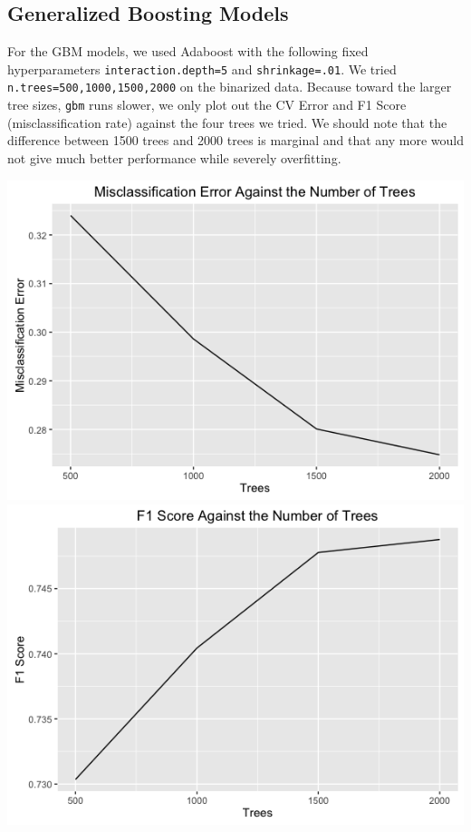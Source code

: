 \documentclass{article}
\begin{document}
\subsection{Generalized Boosting Models}
For the GBM models, we used Adaboost with the following fixed hyperparameters \texttt{interaction.depth=5} and \texttt{shrinkage=.01}. We tried \texttt{n.trees=500,1000,1500,2000} on the binarized data. Because toward the larger tree sizes, \texttt{gbm} runs slower, we only plot out the CV Error and F1 Score (misclassification rate) against the four trees we tried. We should note that the difference between 1500 trees and 2000 trees is marginal and that any more would not give much better performance while severely overfitting. \\
\centerline{\includegraphics[scale=.35]{diagrams/4gbm.png}\includegraphics[scale=.35]{diagrams/5gbm.png}}
\end{document}
